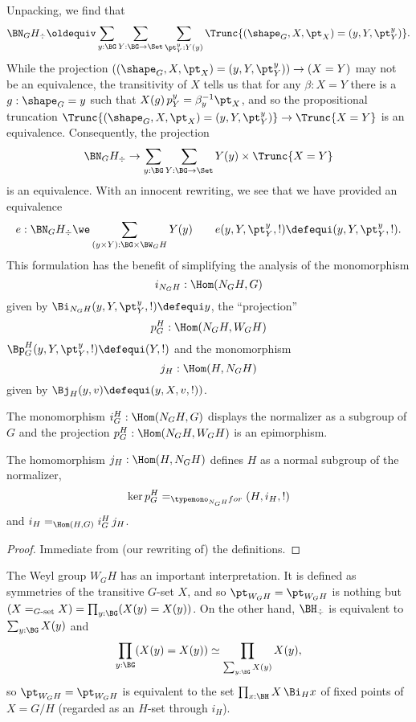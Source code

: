 Unpacking, we find that
$$\BN_GH_\div\oldequiv \sum_{y:\BG}\sum_{Y:\BG\to\Set}\sum_{\pt^y_Y:Y(y)} \Trunc{(\shape_G,X,\pt_X)=(y,Y,\pt^y_Y)}.$$
While the projection $((\shape_G,X,\pt_X)=(y,Y,\pt^y_Y))\to (X=Y)$ may not be an equivalence, the transitivity of $X$ tells us that for any $\beta:X=Y$ there is a $g:\shape_G=y$ such that $X(g)\,p^y_Y=\beta^{-1}_y\pt_X$, and so the propositional truncation $\Trunc{(\shape_G,X,\pt_X)=(y,Y,\pt^y_Y)} \to \Trunc{X=Y}$ is an equivalence.
Consequently, the projection
$$\BN_GH_\div\to \sum_{y:\BG}\sum_{Y:\BG\to\Set}Y(y)\times\Trunc{X=Y}$$
is an equivalence.  With an innocent rewriting, we see that we have provided an equivalence
$$e:\BN_GH_\div\we\sum_{(y\times Y):\BG\times \BW_GH}Y(y)\qquad e(y,Y,\pt^y_Y,!)\defequi (y,Y,\pt^y_Y,!).$$
This formulation has the benefit of simplifying the analysis of the monomorphism
$$i_{N_GH}:\Hom(N_GH,G)$$
given by $\Bi_{N_GH}(y,Y,\pt^y_Y,!)\defequi y$, the ``projection''
 $$p_G^H:\Hom(N_GH,W_GH)$$
$\Bp_G^H(y,Y,\pt^y_Y,!)\defequi (Y,!)$ and the monomorphism
$$j_H:\Hom(H,N_GH)$$
given by $\Bj_H(y,v)\defequi(y,X,v,!))$.




\begin{lemma}
  The monomorphism $i_G^H:\Hom(N_GH,G)$ displays the normalizer as a subgroup of $G$ and the projection $p_G^H:\Hom(N_GH,W_GH)$ is an epimorphism.

The homomorphism $j_H:\Hom(H,N_GH)$ defines $H$ as a normal subgroup of the normalizer,
$$\ker p_G^H=_{\typemono_{N_GH}for}(H,i_H,!)$$
and $i_H=_{\Hom(H,G)}i_G^H\,j_H$.
\end{lemma}
\begin{proof}
  Immediate from (our rewriting of) the definitions.
\end{proof}

The Weyl group $W_GH$ has an important interpretation.  It is defined as symmetries of the transitive $G$-set $X$, and so $\pt_{W_GH}=\pt_{W_GH}$ is nothing but $(X=_{G\text{-set}}X)=\prod_{y:\BG}(X(y)=X(y))$.  On the other hand, $\BH_\div$ is equivalent to $\sum_{y:\BG}X(y)$ and
$$\prod_{y:\BG}(X(y)=X(y))\simeq \prod_{\sum_{y:\BG}X(y)}X(y),$$ so $\pt_{W_GH}=\pt_{W_GH}$ is equivalent to the set $%
\prod_{x:\BH}X\, \Bi_Hx$ of fixed points of $X=G/H$ (regarded as an $H$-set through $i_H$).

